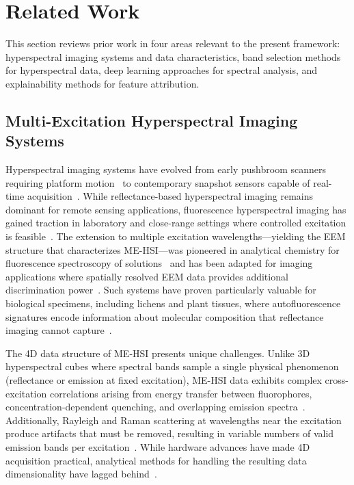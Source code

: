 \section{Related Work}
\label{sec:related_work}

This section reviews prior work in four areas relevant to the present framework: hyperspectral imaging systems and data characteristics, band selection methods for hyperspectral data, deep learning approaches for spectral analysis, and explainability methods for feature attribution.

\subsection{Multi-Excitation Hyperspectral Imaging Systems}
\label{sec:related_hsi}

Hyperspectral imaging systems have evolved from early pushbroom scanners requiring platform motion~\cite{goetz1985imaging} to contemporary snapshot sensors capable of real-time acquisition~\cite{hagen2013review}.
While reflectance-based hyperspectral imaging remains dominant for remote sensing applications, fluorescence hyperspectral imaging has gained traction in laboratory and close-range settings where controlled excitation is feasible~\cite{mishra2017close}.
The extension to multiple excitation wavelengths---yielding the EEM structure that characterizes ME-HSI---was pioneered in analytical chemistry for fluorescence spectroscopy of solutions~\cite{murphy2013fluorescence} and has been adapted for imaging applications where spatially resolved EEM data provides additional discrimination power~\cite{lavine2001exploratory}.
Such systems have proven particularly valuable for biological specimens, including lichens and plant tissues, where autofluorescence signatures encode information about molecular composition that reflectance imaging cannot capture~\cite{croce2019autofluorescence}.

The 4D data structure of ME-HSI presents unique challenges.
Unlike 3D hyperspectral cubes where spectral bands sample a single physical phenomenon (reflectance or emission at fixed excitation), ME-HSI data exhibits complex cross-excitation correlations arising from energy transfer between fluorophores, concentration-dependent quenching, and overlapping emission spectra~\cite{lakowicz2006principles}.
Additionally, Rayleigh and Raman scattering at wavelengths near the excitation produce artifacts that must be removed, resulting in variable numbers of valid emission bands per excitation~\cite{murphy2013fluorescence}.
While hardware advances have made 4D acquisition practical, analytical methods for handling the resulting data dimensionality have lagged behind~\cite{mishra2017close}.

